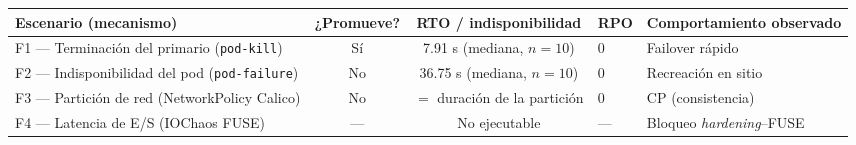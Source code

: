 \begin{tabular}{lccll}
\toprule
Escenario (mecanismo) & ¿Promueve? & RTO / indisponibilidad & RPO & Comportamiento observado \\
\midrule
F1 — Terminación del primario (\texttt{pod-kill}) & Sí & 7.91 s (mediana, $n=10$) & 0 & Failover rápido \\
F2 — Indisponibilidad del pod (\texttt{pod-failure}) & No & 36.75 s (mediana, $n=10$) & 0 & Recreación en sitio \\
F3 — Partición de red (NetworkPolicy Calico) & No & $=$ duración de la partición & 0 & CP (consistencia) \\
F4 — Latencia de E/S (IOChaos FUSE) & --- & No ejecutable & --- & Bloqueo \emph{hardening}--FUSE \\
\bottomrule
\end{tabular}
